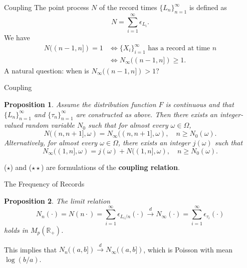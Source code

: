 \documentclass{beamer}
\newtheorem{proposition}{Proposition}
\begin{document}
\begin{frame}{Coupling}
    The point process $N$ of the record times $\{L_n\}_{n = 1}^{\infty}$ is defined as
    \[
    N = \sum_{i = 1}^{\infty} \epsilon_{L_i}.
    \]
    We have
    \begin{align*}
        N((n - 1, n]) = 1 &\iff \text{$\{X_i\}_{i = 1}^{\infty}$ has a record at time $n$} \\
        &\iff N_{\infty}((n - 1, n]) \ge 1.
    \end{align*}
    A natural question: when is $N_{\infty}((n - 1, n]) > 1$?
\end{frame}

\begin{frame}{Coupling}
    \begin{proposition}
        Assume the distribution function $F$ is continuous and that $\{L_n\}_{n = 1}^{\infty}$ and $\{\tau_n\}_{n = 1}^{\infty}$ are constructed as above. Then there exists an integer-valued random variable $N_0$ such that for almost every $\omega \in \Omega$,
        \[
        N((n, n + 1], \omega) = N_{\infty}((n, n + 1], \omega), \quad n \ge N_0(\omega). \tag{$\star$}
        \]
        Alternatively, for almost every $\omega \in \Omega$, there exists an integer $j(\omega)$ such that
        \[
        N_{\infty}((1, n], \omega) = j(\omega) + N((1, n], \omega), \quad n \ge N_0(\omega). \tag{$\star\star$}
        \]
    \end{proposition}
    ($\star$) and ($\star\star$) are formulations of the \textbf{coupling relation}.
\end{frame}

\begin{frame}{The Frequency of Records}
    \begin{proposition}
        The limit relation
        \[
        N_n(\cdot) = N(n\cdot) = \sum_{i = 1}^{\infty} \epsilon_{L_i / n}(\cdot) \xrightarrow{d} N_{\infty}(\cdot) = \sum_{i = 1}^{\infty} \epsilon_{\tau_i}(\cdot)
        \]
        holds in $M_p(\mathbb{R}_+)$.
    \end{proposition}
    This implies that $N_n((a, b]) \xrightarrow{d} N_{\infty}((a, b])$, which is Poisson with mean $\log(b / a)$.
\end{frame}
\end{document}
